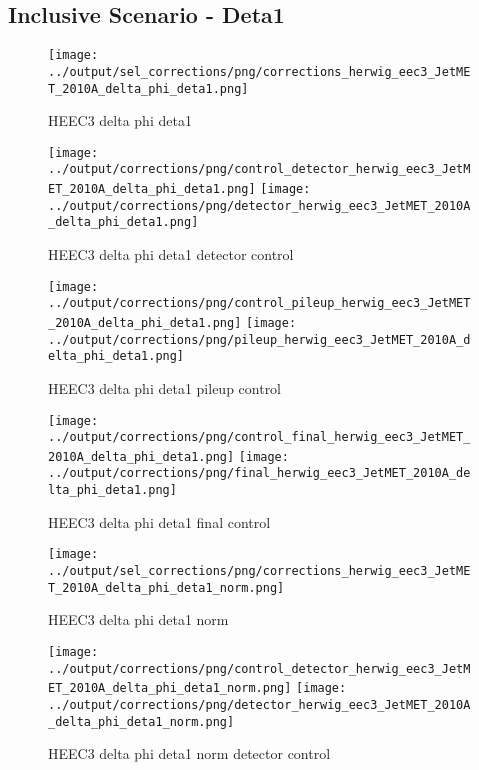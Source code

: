 \documentclass[11pt]{book}
\begin{document}
\clearpage
\subsection{Inclusive Scenario - Deta1}

\begin{figure}[ht]
\centering
\texttt{[image: ../output/sel\_corrections/png/corrections\_herwig\_eec3\_JetMET\_2010A\_delta\_phi\_deta1.png]}
\caption{HEEC3 delta phi deta1}
\label{fig:HEEC3_JetMET_2010A_delta_phi_deta1}
\end{figure}


\begin{figure}[ht]
\centering
\texttt{[image: ../output/corrections/png/control\_detector\_herwig\_eec3\_JetMET\_2010A\_delta\_phi\_deta1.png]}
\texttt{[image: ../output/corrections/png/detector\_herwig\_eec3\_JetMET\_2010A\_delta\_phi\_deta1.png]}
\caption{HEEC3 delta phi deta1 detector control}
\label{fig:HEEC3_JetMET_2010A_delta_phi_deta1_detector_control}
\end{figure}

\begin{figure}[ht]
\centering
\texttt{[image: ../output/corrections/png/control\_pileup\_herwig\_eec3\_JetMET\_2010A\_delta\_phi\_deta1.png]}
\texttt{[image: ../output/corrections/png/pileup\_herwig\_eec3\_JetMET\_2010A\_delta\_phi\_deta1.png]}
\caption{HEEC3 delta phi deta1 pileup control}
\label{fig:HEEC3_JetMET_2010A_delta_phi_deta1_pileup_control}
\end{figure}


\begin{figure}[ht]
\centering
\texttt{[image: ../output/corrections/png/control\_final\_herwig\_eec3\_JetMET\_2010A\_delta\_phi\_deta1.png]}
\texttt{[image: ../output/corrections/png/final\_herwig\_eec3\_JetMET\_2010A\_delta\_phi\_deta1.png]}
\caption{HEEC3 delta phi deta1 final control}
\label{fig:HEEC3_JetMET_2010A_delta_phi_deta1_final_control}
\end{figure}


\begin{figure}[ht]
\centering
\texttt{[image: ../output/sel\_corrections/png/corrections\_herwig\_eec3\_JetMET\_2010A\_delta\_phi\_deta1\_norm.png]}
\caption{HEEC3 delta phi deta1 norm}
\label{fig:HEEC3_JetMET_2010A_delta_phi_deta1_norm}
\end{figure}

\begin{figure}[ht]
\centering
\texttt{[image: ../output/corrections/png/control\_detector\_herwig\_eec3\_JetMET\_2010A\_delta\_phi\_deta1\_norm.png]}
\texttt{[image: ../output/corrections/png/detector\_herwig\_eec3\_JetMET\_2010A\_delta\_phi\_deta1\_norm.png]}
\caption{HEEC3 delta phi deta1 norm detector control}
\label{fig:HEEC3_JetMET_2010A_delta_phi_deta1_norm_detector_control}
\end{figure}
\end{document}
